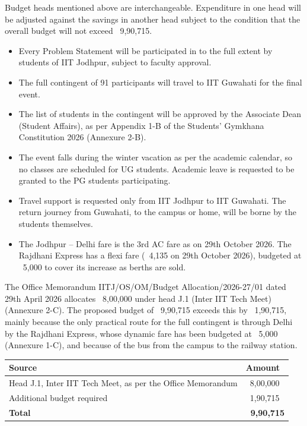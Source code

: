 \documentclass[11pt,letterpaper]{article}
\newcommand{\rs}{{\rupee}}
\newcommand{\subhead}[1]{\par\needspace{6\baselineskip}{\bfseries #1}\par\nopagebreak}
\begin{document}
{\small * Budget heads mentioned above are interchangeable. Expenditure in one head will be adjusted against the savings in another head subject to the condition that the overall budget will not exceed \rs~9,90,715.}

\begin{itemize}
  \item Every Problem Statement will be participated in to the full extent by students of IIT Jodhpur, subject to faculty approval.
  \item The full contingent of 91 participants will travel to IIT Guwahati for the final event.
  \item The list of students in the contingent will be approved by the Associate Dean (Student Affairs), as per Appendix 1-B of the Students' Gymkhana Constitution 2026 (Annexure 2-B).
  \item The event falls during the winter vacation as per the academic calendar, so no classes are scheduled for UG students. Academic leave is requested to be granted to the PG students participating.
  \item Travel support is requested only from IIT Jodhpur to IIT Guwahati. The return journey from Guwahati, to the campus or home, will be borne by the students themselves.
  \item The Jodhpur -- Delhi fare is the 3rd AC fare as on 29th October 2026. The Rajdhani Express has a flexi fare (\rs~4,135 on 29th October 2026), budgeted at \rs~5,000 to cover its increase as berths are sold.
\end{itemize}

\subhead{Funding of the budget}
The Office Memorandum IITJ/OS/OM/Budget Allocation/2026-27/01 dated 29th April 2026 allocates \rs~8,00,000 under head J.1 (Inter IIT Tech Meet) (Annexure 2-C). The proposed budget of \rs~9,90,715 exceeds this by \rs~1,90,715, mainly because the only practical route for the full contingent is through Delhi by the Rajdhani Express, whose dynamic fare has been budgeted at \rs~5,000 (Annexure 1-C), and because of the bus from the campus to the railway station.

\begin{center}
\begin{tabular}{|L{8.4cm}|R{2.8cm}|}
\hline
\textbf{Source} & \textbf{Amount} \\ \hline
Head J.1, Inter IIT Tech Meet, as per the Office Memorandum & \rs~8,00,000 \\ \hline
Additional budget required & \rs~1,90,715 \\ \hline
\textbf{Total} & \textbf{\rs~9,90,715} \\ \hline
\end{tabular}
\end{center}
\end{document}
